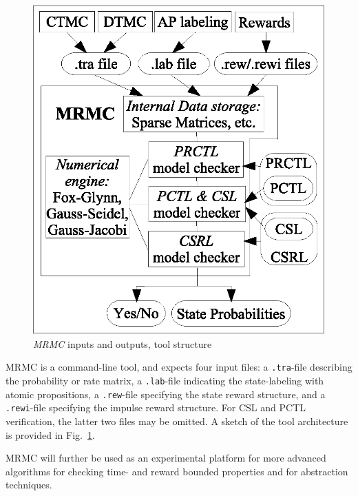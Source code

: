 \documentclass[times, 10pt,twocolumn]{article}
\begin{document}
\begin{figure}[ht]
	\begin{center}
		\includegraphics[scale=0.7, angle=0]{qest_05_figure_01.eps}
	\end{center}
	\caption{\emph{MRMC} inputs and outputs, tool structure \label{fig:general}}
\end{figure}

MRMC is a command-line tool, and expects four input files: a {\tt .tra}-file
describing the probability or rate matrix, a {\tt .lab}-file indicating the
state-labeling with atomic propositions, a {\tt .rew}-file specifying the
state reward structure, and a {\tt .rewi}-file specifying the
impulse reward structure.
For CSL and PCTL verification, the latter two files may be omitted.
A sketch of the tool architecture is provided in Fig.~\ref{fig:general}.


MRMC will further be used as an experimental platform for more advanced 
algorithms for checking time- and reward bounded properties and for
abstraction techniques.

\small{}
\end{document}
